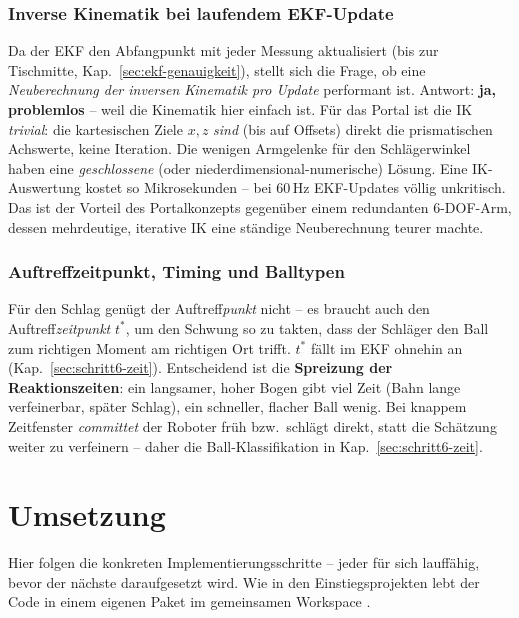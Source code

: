 \subsubsection{Inverse Kinematik bei laufendem EKF-Update}
Da der EKF den Abfangpunkt mit jeder Messung aktualisiert (bis zur Tischmitte,
Kap.~\ref{sec:ekf-genauigkeit}), stellt sich die Frage, ob eine \emph{Neuberechnung
der inversen Kinematik pro Update} performant ist. Antwort: \textbf{ja,
problemlos} -- weil die Kinematik hier einfach ist. Für das Portal ist die IK
\emph{trivial}: die kartesischen Ziele $x,z$ \emph{sind} (bis auf Offsets) direkt
die prismatischen Achswerte, keine Iteration. Die wenigen Armgelenke für den
Schlägerwinkel haben eine \emph{geschlossene} (oder niederdimensional-numerische)
Lösung. Eine IK-Auswertung kostet so Mikrosekunden -- bei 60\,Hz EKF-Updates völlig
unkritisch. Das ist der Vorteil des Portalkonzepts gegenüber einem redundanten
6-DOF-Arm, dessen mehrdeutige, iterative IK eine ständige Neuberechnung teurer
machte.

\subsubsection{Auftreffzeitpunkt, Timing und Balltypen}
Für den Schlag genügt der Auftreff\emph{punkt} nicht -- es braucht auch den
Auftreff\emph{zeitpunkt} $t^\ast$, um den Schwung so zu takten, dass der Schläger
den Ball zum richtigen Moment am richtigen Ort trifft. $t^\ast$ fällt im EKF ohnehin
an (Kap.~\ref{sec:schritt6-zeit}). Entscheidend ist die \textbf{Spreizung der
Reaktionszeiten}: ein langsamer, hoher Bogen gibt viel Zeit (Bahn lange
verfeinerbar, später Schlag), ein schneller, flacher Ball wenig. Bei knappem
Zeitfenster \emph{committet} der Roboter früh bzw.\ schlägt direkt, statt die
Schätzung weiter zu verfeinern -- daher die Ball-Klassifikation in
Kap.~\ref{sec:schritt6-zeit}.

\section{Umsetzung}
Hier folgen die konkreten Implementierungsschritte -- jeder für sich lauffähig,
bevor der nächste daraufgesetzt wird. Wie in den Einstiegsprojekten lebt der Code
in einem eigenen Paket  im gemeinsamen Workspace
.

